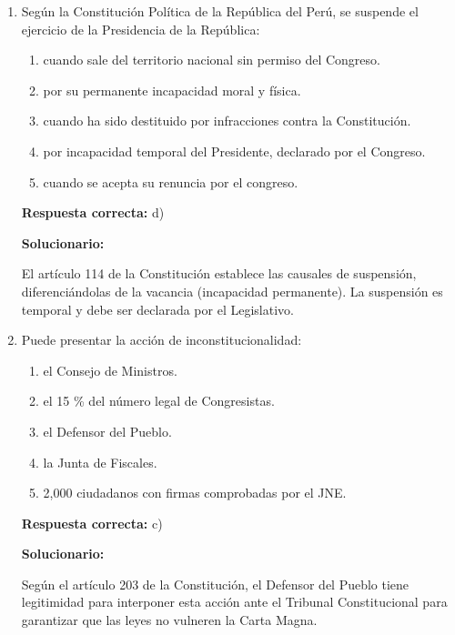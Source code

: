 \begin{enumerate}[resume]
	\item Según la Constitución Política de la República del Perú, se suspende el ejercicio de la Presidencia de la República:
	\begin{enumerate}[label=\alph*)]
		\item cuando sale del territorio nacional sin permiso del Congreso.
		\item por su permanente incapacidad moral y física.
		\item cuando ha sido destituido por infracciones contra la Constitución.
		\item por incapacidad temporal del Presidente, declarado por el Congreso.
		\item cuando se acepta su renuncia por el congreso.
	\end{enumerate}
	\textbf{Respuesta correcta:} d)

	\vspace{2mm}
	\textbf{Solucionario:}

	El artículo 114 de la Constitución establece las causales de suspensión, diferenciándolas de la vacancia (incapacidad permanente). La suspensión es temporal y debe ser declarada por el Legislativo.

	\vspace{6mm}

	\item Puede presentar la acción de inconstitucionalidad:
	\begin{enumerate}[label=\alph*)]
		\item el Consejo de Ministros.
		\item el 15 \% del número legal de Congresistas.
		\item el Defensor del Pueblo.
		\item la Junta de Fiscales.
		\item 2,000 ciudadanos con firmas comprobadas por el JNE.
	\end{enumerate}
	\textbf{Respuesta correcta:} c)

	\vspace{2mm}
	\textbf{Solucionario:}

	Según el artículo 203 de la Constitución, el Defensor del Pueblo tiene legitimidad para interponer esta acción ante el Tribunal Constitucional para garantizar que las leyes no vulneren la Carta Magna.

	\vspace{6mm}


\end{enumerate}
